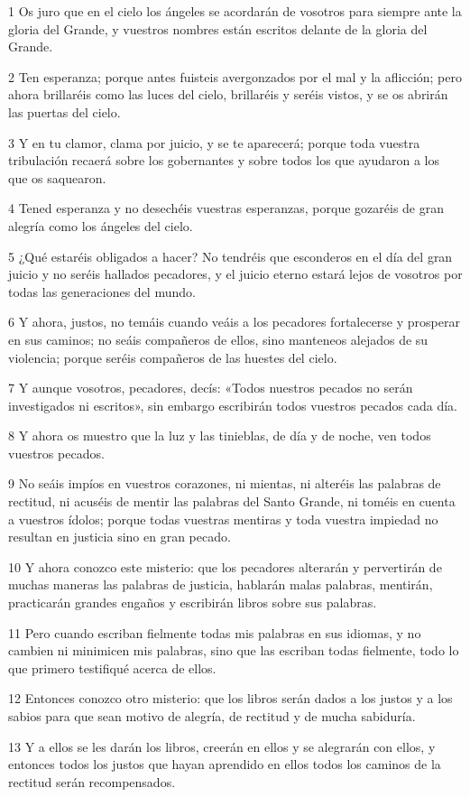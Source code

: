 \par 1 Os juro que en el cielo los ángeles se acordarán de vosotros para siempre ante la gloria del Grande, y vuestros nombres están escritos delante de la gloria del Grande.
\par 2 Ten esperanza; porque antes fuisteis avergonzados por el mal y la aflicción; pero ahora brillaréis como las luces del cielo, brillaréis y seréis vistos, y se os abrirán las puertas del cielo.
\par 3 Y en tu clamor, clama por juicio, y se te aparecerá; porque toda vuestra tribulación recaerá sobre los gobernantes y sobre todos los que ayudaron a los que os saquearon.
\par 4 Tened esperanza y no desechéis vuestras esperanzas, porque gozaréis de gran alegría como los ángeles del cielo.
\par 5 ¿Qué estaréis obligados a hacer? No tendréis que esconderos en el día del gran juicio y no seréis hallados pecadores, y el juicio eterno estará lejos de vosotros por todas las generaciones del mundo.
\par 6 Y ahora, justos, no temáis cuando veáis a los pecadores fortalecerse y prosperar en sus caminos; no seáis compañeros de ellos, sino manteneos alejados de su violencia; porque seréis compañeros de las huestes del cielo.
\par 7 Y aunque vosotros, pecadores, decís: «Todos nuestros pecados no serán investigados ni escritos», sin embargo escribirán todos vuestros pecados cada día.
\par 8 Y ahora os muestro que la luz y las tinieblas, de día y de noche, ven todos vuestros pecados.
\par 9 No seáis impíos en vuestros corazones, ni mientas, ni alteréis las palabras de rectitud, ni acuséis de mentir las palabras del Santo Grande, ni toméis en cuenta a vuestros ídolos; porque todas vuestras mentiras y toda vuestra impiedad no resultan en justicia sino en gran pecado.
\par 10 Y ahora conozco este misterio: que los pecadores alterarán y pervertirán de muchas maneras las palabras de justicia, hablarán malas palabras, mentirán, practicarán grandes engaños y escribirán libros sobre sus palabras.
\par 11 Pero cuando escriban fielmente todas mis palabras en sus idiomas, y no cambien ni minimicen mis palabras, sino que las escriban todas fielmente, todo lo que primero testifiqué acerca de ellos.
\par 12 Entonces conozco otro misterio: que los libros serán dados a los justos y a los sabios para que sean motivo de alegría, de rectitud y de mucha sabiduría.
\par 13 Y a ellos se les darán los libros, creerán en ellos y se alegrarán con ellos, y entonces todos los justos que hayan aprendido en ellos todos los caminos de la rectitud serán recompensados.

